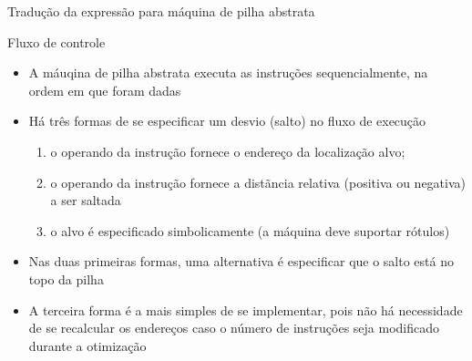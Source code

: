 \begin{frame}[fragile]{Tradução da expressão  para máquina de pilha abstrata}
\end{frame}

\begin{frame}[fragile]{Fluxo de controle}

    \begin{itemize}
        \item A máuqina de pilha abstrata executa as instruções sequencialmente, na ordem em que foram dadas
        \pause

        \item Há três formas de se especificar um desvio (salto) no fluxo de execução
        \pause
        \begin{enumerate}
            \item o operando da instrução fornece o endereço da localização alvo;
            \pause 

            \item o operando da instrução fornece a distãncia relativa (positiva ou negativa) a ser saltada
            \pause

            \item o alvo é especificado simbolicamente (a máquina deve suportar rótulos)
            \pause
        \end{enumerate}

        \item Nas duas primeiras formas, uma alternativa é especificar que o salto está no topo da pilha
        \pause

        \item A terceira forma é a mais simples de se implementar, pois não há necessidade de se recalcular os endereços caso o número de instruções seja
            modificado durante a otimização
    \end{itemize}

\end{frame}

